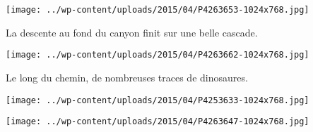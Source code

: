  

 

\begin{center} \texttt{[image: ../wp-content/uploads/2015/04/P4263653-1024x768.jpg]} \end{center}

 

 La descente au fond du canyon finit sur une belle cascade. 

 

\begin{center} \texttt{[image: ../wp-content/uploads/2015/04/P4263662-1024x768.jpg]} \end{center}

 

 Le long du chemin, de nombreuses traces de dinosaures. 

 

\begin{center} \texttt{[image: ../wp-content/uploads/2015/04/P4253633-1024x768.jpg]} \end{center}

 

 

\begin{center} \texttt{[image: ../wp-content/uploads/2015/04/P4263647-1024x768.jpg]} \end{center}




 
 
